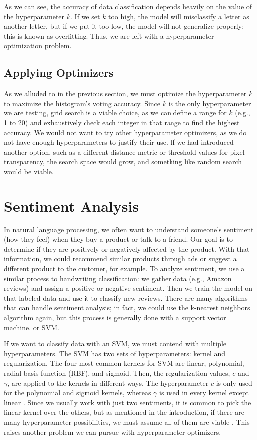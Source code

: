 \documentclass[stu,12pt,floatsintext]{apa7}
\begin{document}
As we can see, the accuracy of data classification depends heavily on the value of the hyperparameter \(k\). If we set \(k\) too high, the model will misclassify a letter as another letter, but if we put it too low, the model will not generalize properly; this is known as overfitting. Thus, we are left with a hyperparameter optimization problem.

\subsection{Applying Optimizers}

As we alluded to in the previous section, we must optimize the hyperparameter \(k\) to maximize the histogram's voting accuracy. Since \(k\) is the only hyperparameter we are testing, grid search is a viable choice, as we can define a range for \(k\) (e.g., 1 to 20) and exhaustively check each integer in that range to find the highest accuracy. We would not want to try other hyperparameter optimizers, as we do not have enough hyperparameters to justify their use. If we had introduced another option, such as a different distance metric or threshold values for pixel transparency, the search space would grow, and something like random search would be viable. 

\section{Sentiment Analysis}

In natural language processing, we often want to understand someone's sentiment (how they feel) when they buy a product or talk to a friend. Our goal is to determine if they are positively or negatively affected by the product. With that information, we could recommend similar products through ads or suggest a different product to the customer, for example. To analyze sentiment, we use a similar process to handwriting classification: we gather data (e.g., Amazon reviews) and assign a positive or negative sentiment. Then we train the model on that labeled data and use it to classify new reviews.  There are many algorithms that can handle sentiment analysis; in fact, we could use the k-nearest neighbors algorithm again, but this process is generally done with a support vector machine, or SVM. 

If we want to classify data with an SVM, we must contend with multiple hyperparameters. The SVM has two sets of hyperparameters: kernel and regularization. The four most common kernels for SVM are linear, polynomial, radial basis function (RBF), and sigmoid. Then, the regularization values, \(c\) and \(\gamma\), are applied to the kernels in different ways. The hyperparameter \(c\) is only used for the polynomial and sigmoid kernels, whereas \(\gamma\) is used in every kernel except linear \parencite{jain_2024_svm}. Since we usually work with just two sentiments, it is common to pick the linear kernel over the others, but as mentioned in the introduction, if there are many hyperparameter possibilities, we must assume all of them are viable \parencite{reddy_2023_sentiment}. This raises another problem we can pursue with hyperparameter optimizers.
\end{document}
